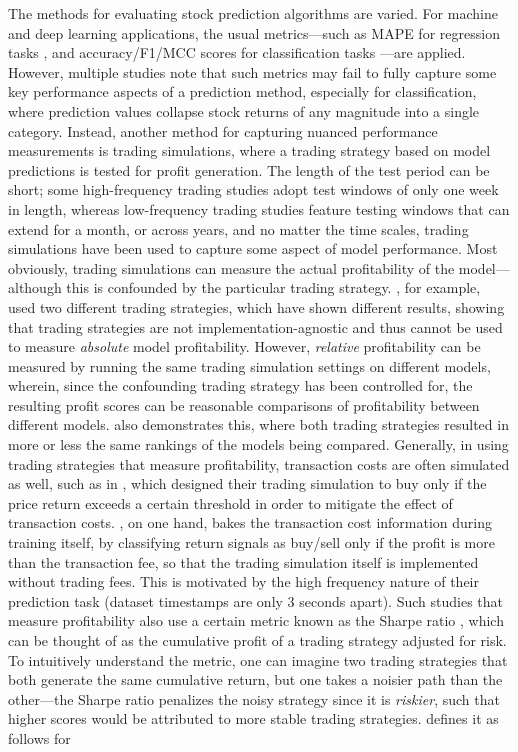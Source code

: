 \documentclass[stu,floatsintext]{apa7}
\begin{document}
The methods for evaluating stock prediction algorithms are varied. For machine and deep learning applications, the usual metrics—such as MAPE for regression tasks \parencite{mohan2019stock}, and accuracy/F1/MCC scores for classification tasks \parencite{khan2023performance}—are applied. However, multiple studies \parencite{chen2024deep,chen2021stock,ke2019predicting} note that such metrics may fail to fully capture some key performance aspects of a prediction method, especially for classification, where prediction values collapse stock returns of any magnitude into a single category. Instead, another method for capturing nuanced performance measurements is trading simulations, where a trading strategy based on model predictions is tested for profit generation. The length of the test period can be short; some high-frequency trading studies \parencite{son2012forecasting,zaznov2024intraday} adopt test windows of only one week in length, whereas low-frequency trading studies \parencite{chen2024deep} feature testing windows that can extend for a month, or across years, and no matter the time scales, trading simulations have been used to capture some aspect of model performance. Most obviously, trading simulations can measure the actual profitability of the model—although this is confounded by the particular trading strategy. \textcite{chen2021stock}, for example, used two different trading strategies, which have shown different results, showing that trading strategies are not implementation-agnostic and thus cannot be used to measure \textit{absolute} model profitability. However, \textit{relative} profitability can be measured by running the same trading simulation settings on different models, wherein, since the confounding trading strategy has been controlled for, the resulting profit scores can be reasonable comparisons of profitability between different models. \textcite{chen2021stock} also demonstrates this, where both trading strategies resulted in more or less the same rankings of the models being compared. Generally, in using trading strategies that measure profitability, transaction costs are often simulated as well, such as in \textcite{li2025transformer}, which designed their trading simulation to buy only if the price return exceeds a certain threshold in order to mitigate the effect of transaction costs. \textcite{yao2018highfrequency}, on one hand, bakes the transaction cost information during training itself, by classifying return signals as buy/sell only if the profit is more than the transaction fee, so that the trading simulation itself is implemented without trading fees. This is motivated by the high frequency nature of their prediction task (dataset timestamps are only 3 seconds apart). Such studies that measure profitability also use a certain metric known as the Sharpe ratio \parencite{chen2021stock}, which can be thought of as the cumulative profit of a trading strategy adjusted for risk. To intuitively understand the metric, one can imagine two trading strategies that both generate the same cumulative return, but one takes a noisier path than the other—the Sharpe ratio penalizes the noisy strategy since it is \textit{riskier}, such that higher scores would be attributed to more stable trading strategies. \textcite{chen2021stock} defines it as follows for 
\end{document}
